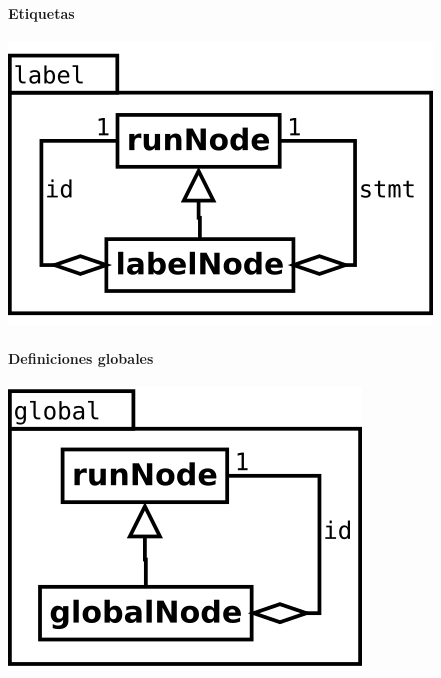 \paragraph {Etiquetas}
\begin{center}
\includegraphics[scale=0.4]{label.png} \\
\end{center}

\paragraph {Definiciones globales}
\begin{center}
\includegraphics[scale=0.4]{global.png} \\
\end{center}

